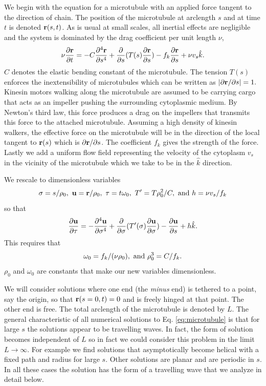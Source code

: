 \documentclass[11pt]{ucthesis}
\def\br{{\bf r}}
\def\bu{{\bf u}}
\begin{document}
We begin with the equation for a microtubule with an applied force tangent to the direction of chain. The position
of the microtubule at arclength $s$ and at time $t$ is denoted $\br(s,t)$. As is usual at small scales, all inertial effects are negligible
and the system is dominated by the drag coefficient per unit length $\nu$,
\begin{equation}
\label{eq:microtubule}
\nu \frac{\partial \br}{\partial t} =  -C \frac{\partial^4 \br}{\partial s^4} + \frac{\partial}{\partial s}(T(s)\frac{\partial \br}{\partial s}) -
f_k \frac{\partial \br}{\partial s} + \nu v_{s}{\hat k} .
\end{equation}
$C$ denotes the elastic bending constant of the microtubule. The tension $T(s)$ enforces the inextensibility of microtubules which
can be written as  $|\partial \br/\partial s| = 1.$ 
Kinesin motors walking along the microtubule are assumed to be carrying cargo that acts as an impeller pushing the surrounding
cytoplasmic medium. By Newton's third law, this force produces a drag on the impellers that transmits this force to the
attached microtubule. Assuming a high density of kinesin walkers, the effective force on the microtubule will be in the
direction of the local tangent to $\br(s)$ which is $\partial \br/\partial s$. The coefficient $f_k$ gives the strength of the force.
Lastly we add a uniform flow field representing the velocity of the cytoplasm $v_s$ in the vicinity of the microtubule
which we take to be in the $\hat k$ direction.

We rescale to dimensionless variables 
\begin{equation}
\label{eq:rescale}
\sigma = s/\rho_0,~ \bu = \br/\rho_0, ~ \tau = t \omega_0,  ~ T' = T \rho_0^2/C, ~{\rm and} ~ h = \nu v_s/f_k 
\end{equation}
so that
\begin{equation}
\label{eq:dimensionless}
\frac{\partial \bu}{\partial \tau} =  - \frac{\partial^4 \bu}{\partial \sigma^4} + \frac{\partial}{\partial \sigma}(T'(\sigma)\frac{\partial \bu}{\partial \sigma}) -
\frac{\partial \bu}{\partial s} + h {\hat k} .
\end{equation}
This requires that 
\begin{equation}
\label{eq:scaling}
\omega_0 = f_k/(\nu \rho_0), ~  {\rm and} ~ \rho_0^3 = C/f_k. 
\end{equation}
$\rho_0$ and $\omega_0$ are constants that make our new variables dimensionless.

We will consider solutions where one end (the {\em minus} end) is tethered to a point, say the origin, so that
$\br(s=0,t) = 0$ and is freely hinged at that point. The other end is free.
The total arclength of the microtubule is denoted by $L$.
The general characteristic of all numerical solutions to Eq. \ref{eq:microtubule} is that
for large $s$ the solutions appear to be travelling waves. In fact, the form of solution
becomes independent of $L$ so in fact we could consider this problem in the limit $L\rightarrow \infty$.
For example we find solutions that asymptotically become helical with a fixed path and radius for
large $s$. Other solutions are planar and are periodic in $s$. In all these cases the solution
has the form of a travelling wave that we analyze in detail below.
\end{document}
